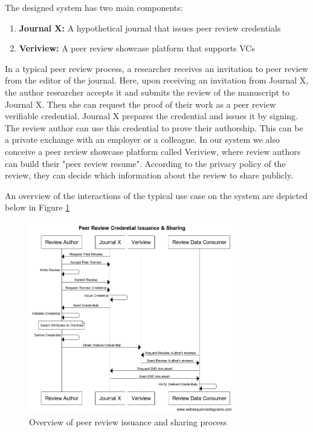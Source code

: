 The designed system has two main components:

\begin{enumerate}
    \item \textbf{Journal X:} A hypothetical journal that issues peer review credentials
    \item \textbf{Veriview:} A peer review showcase platform that supports VCs
\end{enumerate}

In a typical peer review process, a researcher receives an invitation to peer review from the editor of the journal. Here, upon receiving an invitation from Journal X, the author researcher accepts it and submits the review of the manuscript to Journal X. Then she can request the proof of their work as a peer review verifiable credential. Journal X prepares the credential and issues it by signing. The review author can use this credential to prove their authorship. This can be a private exchange with an employer or a colleague. In our system we also conceive a peer review showcase platform called Veriview, where review authors can build their "peer review resume". According to the privacy policy of the review, they can decide which information about the review to share publicly.

An overview of the interactions of the typical use case on the system are depicted below in Figure \ref{fig:sequence1} 

\begin{figure}[htpb]
  \centering
  \includegraphics[width=0.8\textwidth]{figures/sequence.png}
  \caption{Overview of peer review issuance and sharing process} \label{fig:sequence1}
\end{figure}

